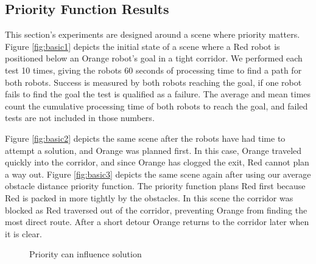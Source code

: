 \documentclass[12pt,journal,compsoc]{IEEEtran}
\begin{document}
\subsection{Priority Function Results}\label{sect:priority}
This section's experiments are designed around a scene where priority matters. Figure \ref{fig:basic1} depicts the initial state of a scene where a Red robot is positioned below an Orange robot's goal in a tight corridor. We performed each test 10 times, giving the robots 60 seconds of processing time to find a path for both robots. Success is measured by both robots reaching the goal, if one robot fails to find the goal the test is qualified as a failure. The average and mean times count  the cumulative processing time of both robots to reach the goal, and failed tests are not included in those numbers.
\par
Figure \ref{fig:basic2} depicts the same scene after the robots have had time to attempt a solution, and Orange was planned first. In this case, Orange traveled quickly into the corridor, and since Orange has clogged the exit, Red cannot plan a way out. Figure \ref{fig:basic3} depicts the same scene again after using our average obstacle distance priority function. The priority function plans Red first because Red is packed in more tightly by the obstacles. In this scene the corridor was blocked as Red traversed out of the corridor, preventing Orange from finding the most direct route. After a short detour Orange returns to the corridor later when it is clear.

\begin{figure}[ht]
\centering
{}
\caption{Priority can influence solution}\label{fig:basicscenes}
\end{figure}
\end{document}
